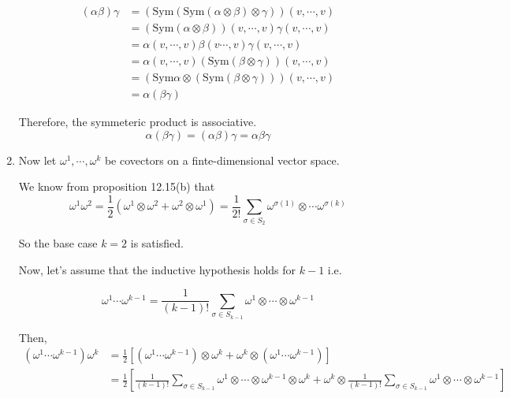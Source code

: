 \documentclass{article}
\begin{document}
\begin{enumerate}[label=(\alph*)]
\begin{align*}
  \left(\alpha \beta\right) \gamma &= \left( \mathrm{Sym} \left(\mathrm{Sym}(\alpha \otimes \beta) \otimes \gamma \right) \right)(v, \cdots, v) \\ 
  &= \left(\mathrm{Sym}(\alpha \otimes \beta)\right) (v, \cdots, v) \gamma \left(v, \cdots, v\right) \\
  &= \alpha (v, \cdots, v) \beta(v \cdots, v) \gamma(v, \cdots, v) \\
  &= \alpha(v, \cdots, v) \left(\mathrm{Sym}(\beta \otimes \gamma)\right) (v, \cdots, v) \\
  &= \left( \mathrm{Sym} \alpha \otimes \left( \mathrm{Sym} (\beta \otimes \gamma)\right)  \right) (v, \cdots, v) \\
  &= \alpha (\beta \gamma)
\end{align*}

Therefore, the symmeteric product is associative.
\[ \alpha \left( \beta \gamma \right) = \left(\alpha \beta \right) \gamma = \alpha \beta \gamma \]

\vsize 0.5cm
\item Now let $\omega^1, \cdots, \omega^k$ be covectors on a finte-dimensional vector space.

\vskip 0.25cm
We know from proposition 12.15(b) that 
\[ \omega^1 \omega^2 = \frac{1}{2}\left(\omega^1 \otimes \omega^2 + \omega^2 \otimes \omega^1\right) = \frac{1}{2!} \sum_{\sigma \in S_2} \omega^{\sigma(1)} \otimes \cdots \omega^{\sigma(k)} \]

So the base case $k = 2$ is satisfied.

Now, let's assume that the inductive hypothesis holds for $k-1$ i.e.

\[ \omega^1 \cdots \omega^{k-1} = \frac{1}{(k-1)!} \sum_{\sigma \in S_{k-1}}  \omega^1 \otimes \cdots \otimes \omega^{k-1}   \]

Then, 
\begin{align*}
  \left( \omega^1 \cdots \omega^{k-1} \right) \omega^k &= \frac{1}{2} \left[  \left( \omega^1 \cdots \omega^{k-1} \right) \otimes \omega^{k} + \omega^k \otimes  \left( \omega^1 \cdots \omega^{k-1} \right) \right] \\\
  &= \frac{1}{2} \left[  \frac{1}{(k-1)!} \sum_{\sigma \in S_{k-1}}  \omega^1 \otimes \cdots \otimes \omega^{k-1}\otimes \omega^{k} + \omega^k \otimes  \frac{1}{(k-1)!} \sum_{\sigma \in S_{k-1}}  \omega^1 \otimes \cdots \otimes \omega^{k-1} \right] \\
\end{align*}


\end{enumerate}
\end{document}
